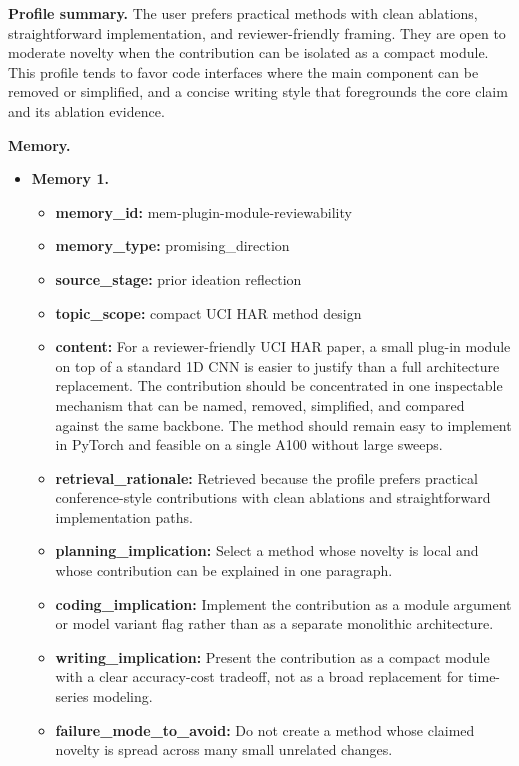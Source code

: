 \documentclass{opendatalab}
\begin{document}
\begin{tcolorbox}
\textbf{Profile summary.}\;
The user prefers practical methods with clean ablations, straightforward implementation, and reviewer-friendly framing. They are open to moderate novelty when the contribution can be isolated as a compact module. This profile tends to favor code interfaces where the main component can be removed or simplified, and a concise writing style that foregrounds the core claim and its ablation evidence.

\medskip
\textbf{Memory.}
\begin{itemize}\setlength\itemsep{2pt}
  \item \textbf{Memory 1.}
  \begin{itemize}\setlength\itemsep{1pt}
    \item \textbf{memory\_id:} mem-plugin-module-reviewability
    \item \textbf{memory\_type:} promising\_direction
    \item \textbf{source\_stage:} prior ideation reflection
    \item \textbf{topic\_scope:} compact UCI HAR method design
    \item \textbf{content:} For a reviewer-friendly UCI HAR paper, a small plug-in module on top of a standard 1D CNN is easier to justify than a full architecture replacement. The contribution should be concentrated in one inspectable mechanism that can be named, removed, simplified, and compared against the same backbone. The method should remain easy to implement in PyTorch and feasible on a single A100 without large sweeps.
    \item \textbf{retrieval\_rationale:} Retrieved because the profile prefers practical conference-style contributions with clean ablations and straightforward implementation paths.
    \item \textbf{planning\_implication:} Select a method whose novelty is local and whose contribution can be explained in one paragraph.
    \item \textbf{coding\_implication:} Implement the contribution as a module argument or model variant flag rather than as a separate monolithic architecture.
    \item \textbf{writing\_implication:} Present the contribution as a compact module with a clear accuracy-cost tradeoff, not as a broad replacement for time-series modeling.
    \item \textbf{failure\_mode\_to\_avoid:} Do not create a method whose claimed novelty is spread across many small unrelated changes.
  \end{itemize}


\end{itemize}
\end{tcolorbox}
\end{document}
